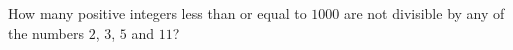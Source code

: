 How many positive integers less than or equal to $1000$ are not divisible by any of the numbers $2$, $3$, $5$ and $11$?
